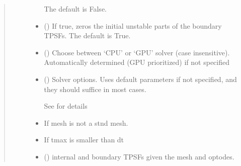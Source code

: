 \documentclass[letterpaper,10pt,english]{sphinxmanual}
\begin{document}
\begin{fulllineitems}
\begin{quote}
\begin{description}
\begin{itemize}
\sphinxAtStartPar
The default is False.


\item {} 
\sphinxAtStartPar
{} (\sphinxstyleliteralemphasis{\sphinxupquote{, }}) \textendash{} If true, zeros the initial unstable parts of the boundary TPSFs. The default is True.

\item {} 
\sphinxAtStartPar
{} (\sphinxstyleliteralemphasis{\sphinxupquote{, }}) \textendash{} Choose between ‘CPU’ or ‘GPU’ solver (case insensitive). Automatically determined (GPU prioritized) if not specified

\item {} 
\sphinxAtStartPar
{} ({\hyperref[\detokenize{_autosummary/nirfasterff.utils.SolverOptions:nirfasterff.utils.SolverOptions}]{}}\sphinxstyleliteralemphasis{\sphinxupquote{, }}) \textendash{} 
\sphinxAtStartPar
Solver options. Uses default parameters if not specified, and they should suffice in most cases.

\sphinxAtStartPar
See {\hyperref[\detokenize{_autosummary/nirfasterff.utils.SolverOptions:nirfasterff.utils.SolverOptions}]{}} for details


\end{itemize}

\begin{itemize}
\item {} 
\sphinxAtStartPar
{} \textendash{} If mesh is not a stnd mesh.

\item {} 
\sphinxAtStartPar
{} \textendash{} If tmax is smaller than dt

\end{itemize}

\sphinxAtStartPar
\begin{itemize}
\item {} 
\sphinxAtStartPar
{} () \textendash{} internal and boundary TPSFs given the mesh and optodes.


\end{itemize}
\end{description}
\end{quote}
\end{fulllineitems}
\end{document}
